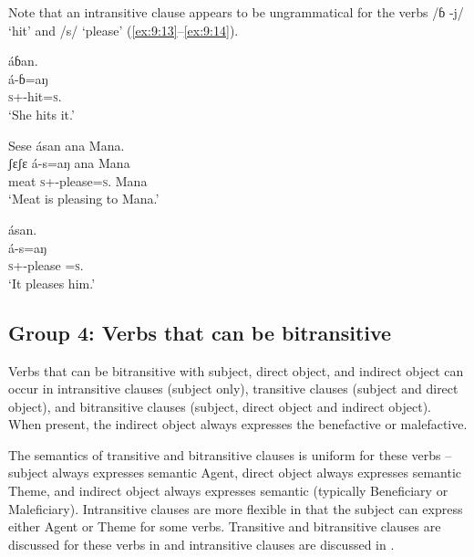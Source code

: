 Note that an intransitive clause appears to be ungrammatical for the verbs \newline/ɓ -j/ ‘hit’ and /s/ ‘please’ (\ref{ex:9:13}--\ref{ex:9:14}).

\ea \label{ex:9:13}

\medskip
\ex
{áɓan. \\
\gll  á-ɓ=aŋ\\
      \textsc{s}+{\IFV}-hit=\textsc{s}.{\IO}\\
\glt  ‘She hits it.’}
\z\z

\ea \label{ex:9:14}
\ea Sese ásan ana Mana. \\
\gll  ʃɛʃɛ  á-s=aŋ         ana   Mana\\
      meat    \textsc{s}+{\IFV}-please=\textsc{s}.{\IO}  {\DAT}  Mana\\
\glt  ‘Meat is pleasing to Mana.’

\medskip
\ex
{ásan. \\
\gll  á-s=aŋ\\
      \textsc{s}+{\IFV}-please =\textsc{s}.{\IO}\\
\glt  ‘It pleases him.’}
\z\z


\subsection{Group 4: Verbs that can be bitransitive}\label{sec:9.2.4}
\hypertarget{RefHeading1212721525720847}{}
Verbs that can be bitransitive with subject, direct object, and indirect object can occur in intransitive clauses (subject only), transitive clauses (subject and direct object), and bitransitive clauses (subject, direct object and indirect object). When present, the indirect object always expresses the benefactive or malefactive. 

The semantics of transitive and bitransitive clauses is uniform for these verbs – subject always expresses semantic Agent, direct object always expresses semantic Theme, and indirect object always expresses semantic \LOC (typically Beneficiary or Maleficiary). Intransitive clauses are more flexible in that the subject can express either Agent or Theme for some verbs. Transitive and bitransitive clauses are discussed for these verbs in  and intransitive clauses are discussed in .

